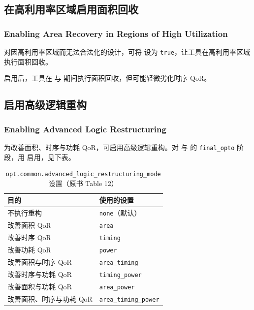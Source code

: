 \subsection{在高利用率区域启用面积回收}
\subsubsection*{Enabling Area Recovery in Regions of High Utilization}

对因高利用率区域而无法合法化的设计，可将  设为 \texttt{true}，让工具在高利用率区域执行面积回收。

启用后，工具在  与  期间执行面积回收，但可能轻微劣化时序 QoR。

\subsection{启用高级逻辑重构}
\subsubsection*{Enabling Advanced Logic Restructuring}

为改善面积、时序与功耗 QoR，可启用高级逻辑重构。对  与  的 \texttt{final\_opto} 阶段，用  启用，见下表。

\begin{table}[htbp]
\centering
\caption{\texttt{opt.common.advanced\_logic\_restructuring\_mode} 设置（原书 Table 12）}
\label{tab:ch2b-adv-restruct}
\begin{tabularx}{\textwidth}{@{}X l@{}}
\toprule
\textbf{目的} & \textbf{使用的设置} \\
\midrule
不执行重构 & \texttt{none}（默认） \\
改善面积 QoR & \texttt{area} \\
改善时序 QoR & \texttt{timing} \\
改善功耗 QoR & \texttt{power} \\
改善面积与时序 QoR & \texttt{area\_timing} \\
改善时序与功耗 QoR & \texttt{timing\_power} \\
改善面积与功耗 QoR & \texttt{area\_power} \\
改善面积、时序与功耗 QoR & \texttt{area\_timing\_power} \\
\bottomrule
\end{tabularx}
\end{table}

